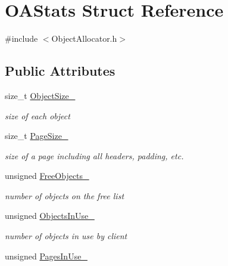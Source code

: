 \hypertarget{structOAStats}{\section{O\-A\-Stats Struct Reference}
\label{structOAStats}
}


{\ttfamily \#include $<$Object\-Allocator.\-h$>$}

\subsection*{Public Attributes}
\begin{DoxyCompactItemize}
\item 
\hypertarget{structOAStats_a294ec0047fece90e9e4970e611522dfc}{size\-\_\-t \hyperlink{structOAStats_a294ec0047fece90e9e4970e611522dfc}{Object\-Size\-\_\-}}\label{structOAStats_a294ec0047fece90e9e4970e611522dfc}

\begin{DoxyCompactList}\small\item\em size of each object \end{DoxyCompactList}\item 
\hypertarget{structOAStats_a0c3f00ddde8a85cabbc3e0b552533872}{size\-\_\-t \hyperlink{structOAStats_a0c3f00ddde8a85cabbc3e0b552533872}{Page\-Size\-\_\-}}\label{structOAStats_a0c3f00ddde8a85cabbc3e0b552533872}

\begin{DoxyCompactList}\small\item\em size of a page including all headers, padding, etc. \end{DoxyCompactList}\item 
\hypertarget{structOAStats_a70c1dc51d208c7f074234adfb6e9aeef}{unsigned \hyperlink{structOAStats_a70c1dc51d208c7f074234adfb6e9aeef}{Free\-Objects\-\_\-}}\label{structOAStats_a70c1dc51d208c7f074234adfb6e9aeef}

\begin{DoxyCompactList}\small\item\em number of objects on the free list \end{DoxyCompactList}\item 
\hypertarget{structOAStats_a35d2f124ea86392b4a9601647aeba597}{unsigned \hyperlink{structOAStats_a35d2f124ea86392b4a9601647aeba597}{Objects\-In\-Use\-\_\-}}\label{structOAStats_a35d2f124ea86392b4a9601647aeba597}

\begin{DoxyCompactList}\small\item\em number of objects in use by client \end{DoxyCompactList}\item 
\hypertarget{structOAStats_a215702d960001b3e9149ed003f9ceba8}{unsigned \hyperlink{structOAStats_a215702d960001b3e9149ed003f9ceba8}{Pages\-In\-Use\-\_\-}}\label{structOAStats_a215702d960001b3e9149ed003f9ceba8}


\end{DoxyCompactItemize}
